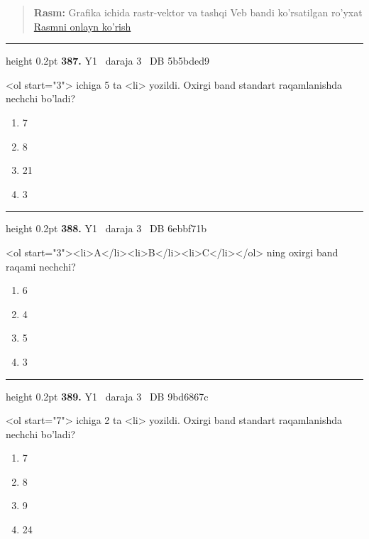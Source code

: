 \documentclass[10pt,a4paper,oneside]{article}
\begin{document}
\begin{quote}\footnotesize\color{muted}\textbf{Rasm:} Grafika ichida rastr-vektor va tashqi Veb bandi ko'rsatilgan ro'yxat\\
\href{https://github.com/sarvar9417/attestatsiya/blob/main/public/graphics-web-v2/nested_list.svg}{Rasmni onlayn ko'rish}
\end{quote}
\vspace{2mm}\hrule height 0.2pt \vspace{4mm}
\hypertarget{q387}{\textbf{\color{ink}387.}}  {\color{muted}\scriptsize Y1 \textbullet\ daraja 3 \textbullet\ DB 5b5bded9}
\par
\textless{}ol start="3"\textgreater{} ichiga 5 ta \textless{}li\textgreater{} yozildi. Oxirgi band standart raqamlanishda nechchi bo'ladi?
\begin{enumerate}[label=\Alph*),leftmargin=9mm]
\item 7
\item 8
\item 21
\item 3
\end{enumerate}
\vspace{2mm}\hrule height 0.2pt \vspace{4mm}
\hypertarget{q388}{\textbf{\color{ink}388.}}  {\color{muted}\scriptsize Y1 \textbullet\ daraja 3 \textbullet\ DB 6ebbf71b}
\par
\textless{}ol start="3"\textgreater{}\textless{}li\textgreater{}A\textless{}/li\textgreater{}\textless{}li\textgreater{}B\textless{}/li\textgreater{}\textless{}li\textgreater{}C\textless{}/li\textgreater{}\textless{}/ol\textgreater{} ning oxirgi band raqami nechchi?
\begin{enumerate}[label=\Alph*),leftmargin=9mm]
\item 6
\item 4
\item 5
\item 3
\end{enumerate}
\vspace{2mm}\hrule height 0.2pt \vspace{4mm}
\hypertarget{q389}{\textbf{\color{ink}389.}}  {\color{muted}\scriptsize Y1 \textbullet\ daraja 3 \textbullet\ DB 9bd6867c}
\par
\textless{}ol start="7"\textgreater{} ichiga 2 ta \textless{}li\textgreater{} yozildi. Oxirgi band standart raqamlanishda nechchi bo'ladi?
\begin{enumerate}[label=\Alph*),leftmargin=9mm]
\item 7
\item 8
\item 9
\item 24
\end{enumerate}
\end{document}
